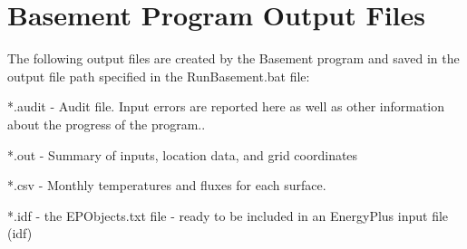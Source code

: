 \section{Basement Program Output Files}\label{basement-program-output-files}

The following output files are created by the Basement program and saved in the output file path specified in the RunBasement.bat file:

*.audit - Audit file. Input errors are reported here as well as other information about the progress of the program..

*.out - Summary of inputs, location data, and grid coordinates

*.csv - Monthly temperatures and fluxes for each surface.

*.idf - the EPObjects.txt file - ready to be included in an EnergyPlus input file (idf)
